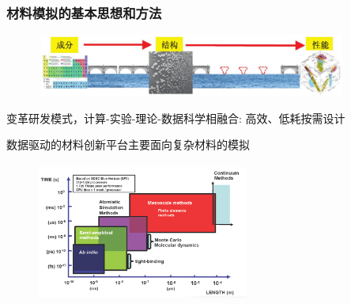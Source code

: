\frame
{
	\frametitle{材料模拟的基本思想和方法}
\begin{figure}[h!]
\vspace*{-0.25in}
\centering
\includegraphics[height=0.80in,width=4.05in]{Figures/MGE-2.png}
\label{MGE}
\end{figure}
\begin{minipage}[c]{0.30\textwidth}
\begin{itemize}%
\vspace*{-2.25in}
 {\fontsize{7.5pt}{6.0pt}\selectfont
	 \setlength{\itemsep}{10pt}
 \item 变革研发模式，计算-实验-理论-数据科学相融合: 高效、低耗按需设计
 \item 数据驱动的材料创新平台主要面向复杂材料的模拟}
 \end{itemize}
\end{minipage}
\hfill
\begin{minipage}[b]{0.68\textwidth}
\begin{figure}[h!]
\centering
\includegraphics[height=1.80in,width=2.75in]{Figures/Multi-Scale-6.png}
\label{Multi-Scale}
\end{figure}
\end{minipage}
}


